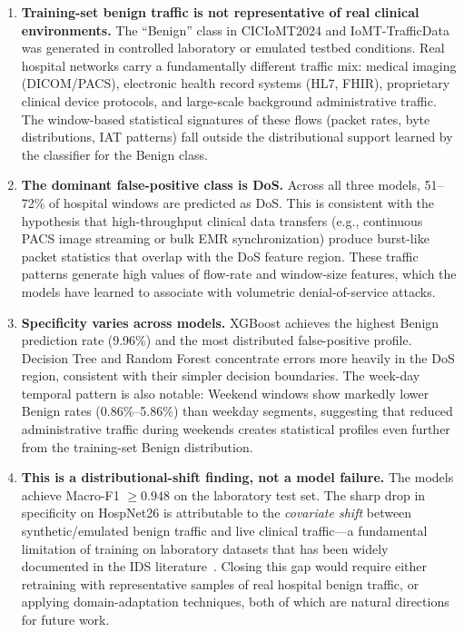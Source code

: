 \begin{enumerate}[nosep]
  \item \textbf{Training-set benign traffic is not representative of real clinical environments.} The ``Benign'' class in CICIoMT2024 and IoMT-TrafficData was generated in controlled laboratory or emulated testbed conditions. Real hospital networks carry a fundamentally different traffic mix: medical imaging (DICOM/PACS), electronic health record systems (HL7, FHIR), proprietary clinical device protocols, and large-scale background administrative traffic. The window-based statistical signatures of these flows (packet rates, byte distributions, IAT patterns) fall outside the distributional support learned by the classifier for the Benign class.

  \item \textbf{The dominant false-positive class is DoS.} Across all three models, 51--72\% of hospital windows are predicted as DoS. This is consistent with the hypothesis that high-throughput clinical data transfers (e.g., continuous PACS image streaming or bulk EMR synchronization) produce burst-like packet statistics that overlap with the DoS feature region. These traffic patterns generate high values of flow-rate and window-size features, which the models have learned to associate with volumetric denial-of-service attacks.

  \item \textbf{Specificity varies across models.} XGBoost achieves the highest Benign prediction rate (9.96\%) and the most distributed false-positive profile. Decision Tree and Random Forest concentrate errors more heavily in the DoS region, consistent with their simpler decision boundaries. The week-day temporal pattern is also notable: Weekend windows show markedly lower Benign rates (0.86\%--5.86\%) than weekday segments, suggesting that reduced administrative traffic during weekends creates statistical profiles even further from the training-set Benign distribution.

  \item \textbf{This is a distributional-shift finding, not a model failure.} The models achieve Macro-F1 $\geq 0.948$ on the laboratory test set. The sharp drop in specificity on HospNet26 is attributable to the \emph{covariate shift} between synthetic/emulated benign traffic and live clinical traffic---a fundamental limitation of training on laboratory datasets that has been widely documented in the IDS literature~\cite{sommer2010outside}. Closing this gap would require either retraining with representative samples of real hospital benign traffic, or applying domain-adaptation techniques, both of which are natural directions for future work.
\end{enumerate}

